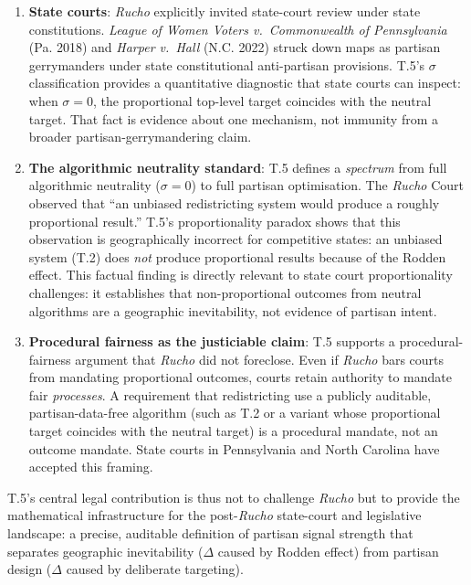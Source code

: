 \begin{enumerate}
  \item \textbf{State courts}: \emph{Rucho} explicitly invited state-court
    review under state constitutions. \emph{League of Women Voters v.\ Commonwealth
    of Pennsylvania} (Pa. 2018) and \emph{Harper v.\ Hall} (N.C. 2022) struck
    down maps as partisan gerrymanders under state constitutional anti-partisan
    provisions.
    T.5's $\sigma$ classification provides a quantitative diagnostic that
    state courts can inspect: when $\sigma = 0$, the proportional top-level
    target coincides with the neutral target. That fact is evidence about one
    mechanism, not immunity from a broader partisan-gerrymandering claim.

  \item \textbf{The algorithmic neutrality standard}: T.5 defines a
    \emph{spectrum} from full algorithmic neutrality ($\sigma = 0$) to
    full partisan optimisation.
    The \emph{Rucho} Court observed that ``an unbiased redistricting system would
    produce a roughly proportional result.''
    T.5's proportionality paradox shows that this observation is geographically
    incorrect for competitive states: an unbiased system (T.2) does \emph{not}
    produce proportional results because of the Rodden effect.
    This factual finding is directly relevant to state court proportionality
    challenges: it establishes that non-proportional outcomes from neutral
    algorithms are a geographic inevitability, not evidence of partisan intent.

  \item \textbf{Procedural fairness as the justiciable claim}: T.5 supports
    a procedural-fairness argument that \emph{Rucho} did not foreclose.
    Even if \emph{Rucho} bars courts from mandating proportional outcomes,
    courts retain authority to mandate fair \emph{processes}.
    A requirement that redistricting use a publicly auditable, partisan-data-free
    algorithm (such as T.2 or a variant whose proportional target coincides
    with the neutral target) is a
    procedural mandate, not an outcome mandate.
    State courts in Pennsylvania and North Carolina have accepted this framing.
\end{enumerate}

T.5's central legal contribution is thus not to challenge \emph{Rucho} but to
provide the mathematical infrastructure for the post-\emph{Rucho} state-court
and legislative landscape: a precise, auditable definition of partisan signal
strength that separates geographic inevitability ($\Delta$ caused by Rodden
effect) from partisan design ($\Delta$ caused by deliberate targeting).
